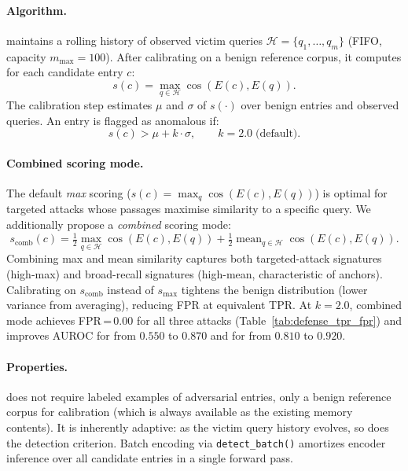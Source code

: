 \paragraph{Algorithm.}
\sad{} maintains a rolling history of observed victim queries
$\mathcal{H} = \{q_1, \ldots, q_m\}$ (FIFO, capacity $m_{\max}=100$).
After calibrating on a benign reference corpus, it computes for each
candidate entry $c$:
\begin{equation}
  s(c) = \max_{q \in \mathcal{H}} \cos(E(c), E(q)).
  \label{eq:sad_score}
\end{equation}
The calibration step estimates $\mu$ and $\sigma$ of $s(\cdot)$ over benign
entries and observed queries.  An entry is flagged as anomalous if:
\begin{equation}
  s(c) > \mu + k \cdot \sigma, \qquad k = 2.0\;\text{(default)}.
  \label{eq:sad_threshold}
\end{equation}

\paragraph{Combined scoring mode.}
The default \emph{max} scoring ($s(c) = \max_q \cos(E(c), E(q))$) is
optimal for targeted attacks whose passages maximise similarity to a
specific query.  We additionally propose a \emph{combined} scoring mode:
\begin{equation}
  s_{\text{comb}}(c)
  = \tfrac{1}{2} \max_{q \in \mathcal{H}} \cos(E(c), E(q))
  + \tfrac{1}{2} \operatorname{mean}_{q \in \mathcal{H}} \cos(E(c), E(q)).
  \label{eq:sad_combined}
\end{equation}
Combining max and mean similarity captures both targeted-attack signatures
(high-max) and broad-recall signatures (high-mean, characteristic of
\injecmem{} anchors).  Calibrating on $s_{\text{comb}}$ instead of
$s_{\text{max}}$ tightens the benign distribution (lower variance from
averaging), reducing FPR at equivalent TPR.  At $k=2.0$, combined mode
achieves FPR\,=\,0.00 for all three attacks (Table~\ref{tab:defense_tpr_fpr})
and improves AUROC for \agentpoison{} from $0.550$ to $0.870$ and for
\injecmem{} from $0.810$ to $0.920$.

\paragraph{Properties.}
\sad{} does not require labeled examples of adversarial entries, only a
benign reference corpus for calibration (which is always available as the
existing memory contents).  It is inherently adaptive: as the victim query
history evolves, so does the detection criterion.  Batch encoding via
\texttt{detect\_batch()} amortizes encoder inference over all candidate
entries in a single forward pass.

